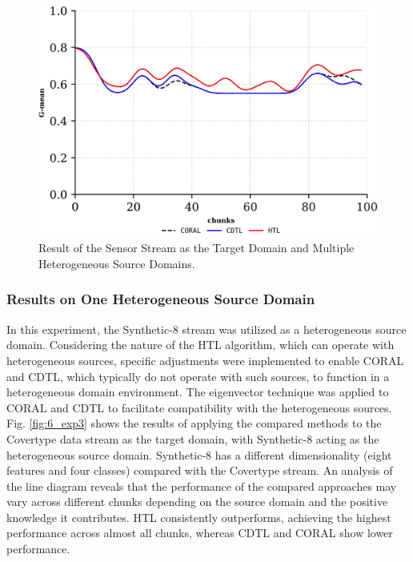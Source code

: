 \begin{figure}[!ht]
	\centering
	\includegraphics[width=1\linewidth]{6_transfer_learning/figures/exp3.png}
	\caption{Result of the Sensor Stream as the Target Domain and Multiple Heterogeneous Source Domains.}
	\label{fig:6_exp5}
\end{figure}

\subsubsection{Results on One Heterogeneous Source Domain}
In this experiment, the Synthetic-8 stream was utilized as a heterogeneous source domain. Considering the nature of the HTL algorithm, which can operate with heterogeneous sources, specific adjustments were implemented to enable CORAL and CDTL, which typically do not operate with such sources, to function in a heterogeneous domain environment. The eigenvector technique was applied to CORAL and CDTL to facilitate compatibility with the heterogeneous sources. Fig. \ref{fig:6_exp3} shows the results of applying the compared methods to the Covertype data stream as the target domain, with Synthetic-8 acting as the heterogeneous source domain. Synthetic-8 has a different dimensionality (eight features and four classes) compared with the Covertype stream. An analysis of the line diagram reveals that the performance of the compared approaches may vary across different chunks depending on the source domain and the positive knowledge it contributes. HTL consistently outperforms, achieving the highest performance across almost all chunks, whereas CDTL and CORAL show lower performance.

